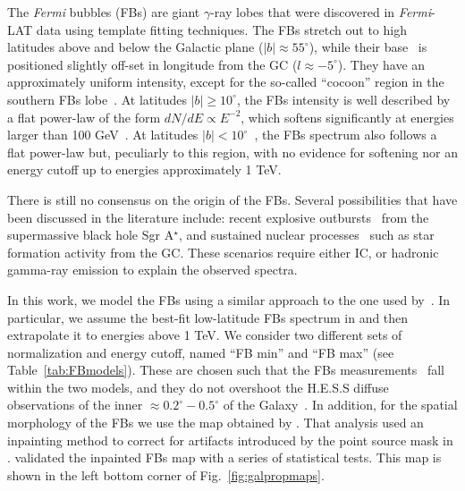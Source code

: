 \documentclass[doublespace,nopageskip]{VTthesis} %
\begin{document}
The \textit{Fermi} bubbles (FBs) are giant $\gamma$-ray lobes that were discovered in \textit{Fermi}-LAT data \citep{Su_etal:2010} using template fitting techniques. The FBs stretch out to high latitudes above and below the Galactic plane ($\lvert b \rvert \approx 55^\circ$), while their base~\citep{Herold:2019pei} is positioned slightly off-set in longitude from the GC ($l\approx-5^\circ$). 
They have an approximately uniform intensity, except for the so-called ``cocoon'' region in the southern FBs lobe~\citep{Su_etal:2012, Fermi-bubbles:2014sfa}. At latitudes $\lvert b
\rvert \geq 10^\circ$, the FBs intensity is well described by a flat power-law of the form $dN/dE\propto E^{-2}$, which  softens significantly at energies larger than 100 GeV~\citep{Fermi-bubbles:2014sfa}. At latitudes $\lvert b \rvert < 10^\circ$~\citep{Acero:2016qlg,TheFermi-LAT:2017vmf,Storm:2017arh,Herold:2019pei}, the FBs spectrum also follows a flat power-law but, peculiarly to this region, with no evidence for softening nor an energy cutoff up to energies approximately 1 TeV. 

There is still no consensus on the origin of the FBs. Several possibilities that have been discussed in the literature include: recent explosive outbursts~\citep{Su_etal:2010} from the supermassive black hole Sgr A$^\star$, and sustained nuclear processes~\citep{Crocker:2014fla} such as star formation activity from the GC. These scenarios require either IC, or hadronic gamma-ray emission to explain the observed spectra.

In this work, we model the FBs using a similar approach to the one used by~\cite{Rinchiuso:2020skh}. In particular, we assume the best-fit low-latitude FBs spectrum in \cite{TheFermi-LAT:2017vmf} and then extrapolate it to energies above 1 TeV. We consider two different sets of normalization and energy cutoff, named ``FB min'' and ``FB max'' (see Table~\ref{tab:FBmodels}). 
%
These are chosen such that the FBs measurements~\citep{TheFermi-LAT:2017vmf} fall within the two models, and they do not overshoot the H.E.S.S diffuse observations of the inner $\approx 0.2^\circ - 0.5^\circ$ of the Galaxy~\citep{Abramowski:2016mir}. In addition, for the spatial morphology of the FBs we use the map obtained by \citet{Macias:2019omb}. That analysis used an inpainting method to correct for artifacts introduced by the point source mask in \cite{TheFermi-LAT:2017vmf}. \cite{Macias:2019omb} validated the inpainted FBs map with a series of statistical tests. This map is shown in the left bottom corner of Fig.~\ref{fig:galpropmaps}.
\end{document}
